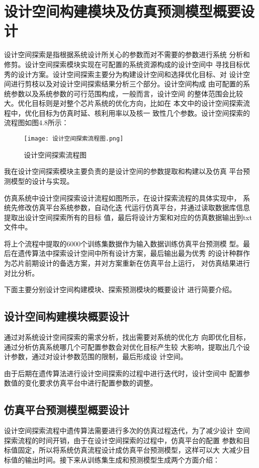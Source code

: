\section{设计空间构建模块及仿真预测模型概要设计}
设计空间探索是指根据系统设计所关心的参数而对不需要的参数进行系统
分析和修剪。设计空间探索模块实现在可配置的系统资源构成的设计空间中
寻找目标优秀的设计方案。设计空间探索主要分为构建设计空间和选择优化目标、对
设计空间进行剪枝以及对设计空间探索结果分析三个部分。设计空间构成
由可配置的系统参数以及系统参数的可行范围构成，一般而言，设计空间
的整体范围会比较大。优化目标则是对整个芯片系统的优化方向，比如在
本文中的设计空间探索流程中，优化目标为仿真时延、核利用率以及核一
致性几个参数。设计空间探索的流程图如图4.8所示：

\begin{figure}[htb]
    \centering
    \texttt{[image: 设计空间探索流程图.png]}
    \caption{设计空间探索流程图}
    \label{fig:badge}
\end{figure}

我在设计空间探索模块主要负责的是设计空间的参数提取和构建以及仿真
平台预测模型的设计与实现。

仿真系统中设计空间探索设计流程如图所示，在设计探索流程的具体实现中，
系统先修改仿真平台系统参数，自动化迭
代运行仿真平台，并通过读取数据库信息提取出设计空间探索所有的目标
值，最后将设计方案和对应的仿真数据输出到txt文件中。

将上个流程中提取的6000个训练集数据作为输入数据训练仿真平台预测模
型。最后在遗传算法中探索设计空间中所有设计方案，最后输出最为优秀
的设计种群作为芯片前期设计的备选方案，并对方案重新在仿真平台上运行，
对仿真结果进行对比分析。

下面主要分别设计空间构建模块、探索预测模块的概要设计
进行简要介绍。

\subsection{设计空间构建模块概要设计}
通过对系统设计空间探索的需求分析，找出需要对系统的优化方
向即优化目标，通过分析仿真系统哪几个可配置参数会对优化目标产生较
大影响，提取出几个设计参数，通过对设计参数范围的限制，最后形成设
计空间。

由于后期在遗传算法进行设计空间探索的过程中进行迭代时，设计空间中
配置参数值的变化要求仿真平台中进行配置参数的调整。

\subsection{仿真平台预测模型概要设计}
设计空间探索流程中遗传算法需要进行多次的仿真过程迭代，为了减少设计
空间探索流程的时间开销，由于在设计空间探索的过程中，仿真平台的配置
参数和目标值固定，所以将系统仿真流程设计成仿真平台预测模型，这样可以大
大减少目标值的输出时间。接下来从训练集生成和预测模型生成两个方面介绍：

